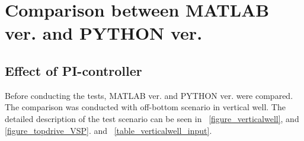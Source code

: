 %

\section{Comparison between MATLAB ver. and PYTHON ver.}

\subsection{Effect of PI-controller}

Before conducting the tests, MATLAB ver. and PYTHON ver. were compared. The comparison was conducted with off-bottom scenario in vertical well. The detailed description of the test scenario can be seen in \figurename~\ref{figure_verticalwell}, and \ref{figure_topdrive_VSP}. and \tablename~\ref{table_verticalwell_input}.
 
